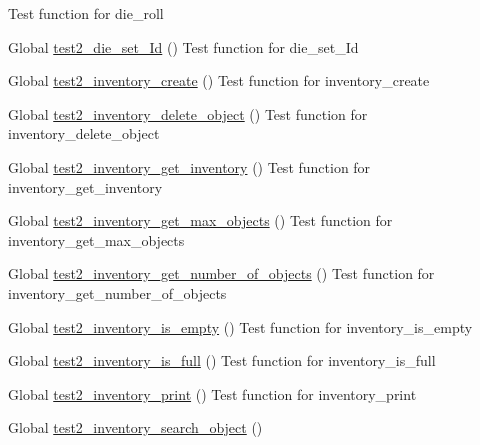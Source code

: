 \begin{DoxyRefList}
%
Test function for die\+\_\+roll  
\item[Global \mbox{\hyperlink{die__test_8c_aba25cb59703baaefe0072882b847925d}{test2\+\_\+die\+\_\+set\+\_\+\+Id}} ()]\label{test__test000027}%
%
Test function for die\+\_\+set\+\_\+\+Id  
\item[Global \mbox{\hyperlink{inventory__test_8c_a73a6080c360a8870c4ffc734e989c8b3}{test2\+\_\+inventory\+\_\+create}} ()]\label{test__test000037}%
%
Test function for inventory\+\_\+create  
\item[Global \mbox{\hyperlink{inventory__test_8c_a7df95a4c69353ae9bf0766e3d13672f8}{test2\+\_\+inventory\+\_\+delete\+\_\+object}} ()]\label{test__test000052}%
%
Test function for inventory\+\_\+delete\+\_\+object  
\item[Global \mbox{\hyperlink{inventory__test_8c_a800414ee6d964ee2424534f14a4dbda9}{test2\+\_\+inventory\+\_\+get\+\_\+inventory}} ()]\label{test__test000047}%
%
Test function for inventory\+\_\+get\+\_\+inventory  
\item[Global \mbox{\hyperlink{inventory__test_8c_ac75954611acab583f780145532ab3197}{test2\+\_\+inventory\+\_\+get\+\_\+max\+\_\+objects}} ()]\label{test__test000071}%
%
Test function for inventory\+\_\+get\+\_\+max\+\_\+objects  
\item[Global \mbox{\hyperlink{inventory__test_8c_afb66a921e4bd9b8df05b0c2fcbbc9649}{test2\+\_\+inventory\+\_\+get\+\_\+number\+\_\+of\+\_\+objects}} ()]\label{test__test000045}%
%
Test function for inventory\+\_\+get\+\_\+number\+\_\+of\+\_\+objects  
\item[Global \mbox{\hyperlink{inventory__test_8c_a4d2a2a4d4ba59446d013debfe9bf05dc}{test2\+\_\+inventory\+\_\+is\+\_\+empty}} ()]\label{test__test000057}%
%
Test function for inventory\+\_\+is\+\_\+empty  
\item[Global \mbox{\hyperlink{inventory__test_8c_a1c9e567d4919d5aaccc9580815a8a81d}{test2\+\_\+inventory\+\_\+is\+\_\+full}} ()]\label{test__test000060}%
%
Test function for inventory\+\_\+is\+\_\+full  
\item[Global \mbox{\hyperlink{inventory__test_8c_ab416dcaf2ae0f9852a8c6ed5eea4f408}{test2\+\_\+inventory\+\_\+print}} ()]\label{test__test000049}%
%
Test function for inventory\+\_\+print  
\item[Global \mbox{\hyperlink{inventory__test_8c_a1aeb71b051c56adb23f374997b3a7662}{test2\+\_\+inventory\+\_\+search\+\_\+object}} ()]\label{test__test000063}%

\end{DoxyRefList}
